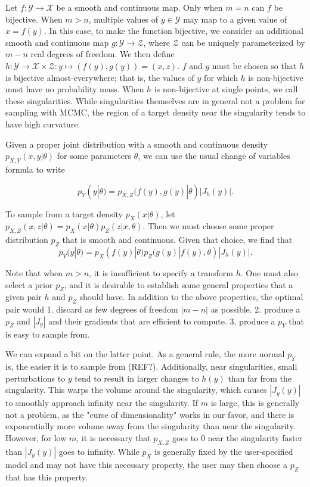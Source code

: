 \documentclass[11pt]{article}
\begin{document}
Let $f\colon \mathcal{Y} \to \mathcal{X}$ be a smooth and continuous map.
Only when $m = n$ can $f$ be bijective.
When $m > n$, multiple values of $y \in \mathcal{Y}$ may map to a given value of $x = f(y)$.
In this case, to make the function bijective, we consider an additional smooth and continuous map $g\colon \mathcal{Y} \to \mathcal{Z}$, where $\mathcal{Z}$ can be uniquely parameterized by $m - n$ real degrees of freedom.
We then define $h\colon \mathcal{Y} \to \mathcal{X} \times \mathcal{Z}: y \mapsto (f(y), g(y)) = (x, z)$.
$f$ and $g$ must be chosen so that $h$ is bijective almost-everywhere;
that is, the values of $y$ for which $h$ is non-bijective must have no probability mass.
When $h$ is non-bijective at single points, we call these singularities.
While singularities themselves are in general not a problem for sampling with MCMC, the region of a target density near the singularity tends to have high curvature.

Given a proper joint distribution with a smooth and continuous density $p_{X,Y}(x, y | \theta)$ for some parameters $\theta$, we can use the usual change of variables formula to write

\[
  p_Y(y | \theta) = p_{X,Z}(f(y), g(y) | \theta) |J_h(y)|.
\]

To sample from a target density $p_X(x | \theta)$, let $p_{X,Z}(x, z | \theta) = p_X(x | \theta) p_Z(z | x, \theta)$.
Then we must choose some proper distribution $p_Z$ that is smooth and continuous.
Given that choice, we find that
\[
  p_Y(y | \theta) = p_X(f(y) | \theta) p_Z(g(y) | f(y), \theta) |J_h(y)|.
\]

Note that when $m > n$, it is insufficient to specify a transform $h$.
One must also select a prior $p_Z$, and it is desirable to establish some general properties that a given pair $h$ and $p_Z$ should have.
In addition to the above properties, the optimal pair would
1. discard as few degrees of freedom $|m - n|$ as possible.
2. produce a $p_Z$ and $|J_y|$ and their gradients that are efficient to compute.
3. produce a $p_Y$ that is easy to sample from.

We can expand a bit on the latter point.
As a general rule, the more normal $p_Y$ is, the easier it is to sample from (REF?).
Additionally, near singularities, small perturbations to $y$ tend to result in larger changes to $h(y)$ than far from the singularity.
This warps the volume around the singularity, which causes $|J_y(y)|$ to smoothly approach infinity near the singularity.
If $m$ is large, this is generally not a problem, as the "curse of dimensionality" works in our favor, and there is exponentially more volume away from the singularity than near the singularity.
However, for low $m$, it is necessary that $p_{X,Z}$ goes to 0 near the singularity faster than $|J_y(y)|$ goes to infinity.
While $p_X$ is generally fixed by the user-specified model and may not have this necessary property, the user may then choose a $p_Z$ that has this property.
\end{document}

